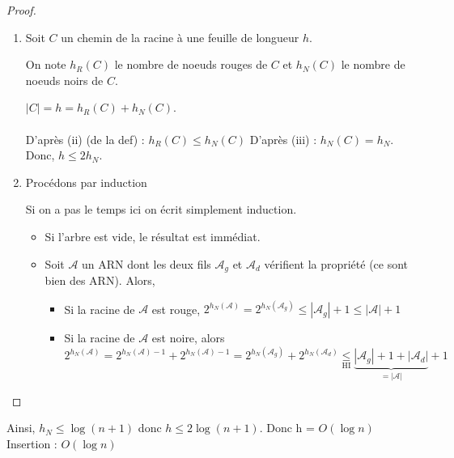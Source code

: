 \begin{proof}
	\begin{enumerate}
		\item Soit $C$ un chemin de la racine à une feuille de longueur $h$.
		
		On note $h_R(C)$ le nombre de noeuds rouges de $C$ et $h_N(C)$ le nombre de noeuds noirs de $C$.
		
		$|C| = h = h_R(C) + h_N(C)$.\\ \\
		D'après (ii) (de la def) : $h_R(C) \leq h_N(C)$
		D'après (iii) : $h_N(C) = h_N$.\\
		
		Donc, $h \leq 2 h_N$.
		
		\item Procédons par induction
		\begin{com}
			Si on a pas le temps ici on écrit simplement induction.
		\end{com}
		\begin{itemize}[label = $\star$]
			\item Si l'arbre est vide, le résultat est immédiat.
			\item Soit $\mathcal A$ un ARN dont les deux fils $\mathcal A_g$ et $\mathcal A_d$ vérifient la propriété (ce sont bien des ARN).
			Alors, \begin{itemize}
				\item Si la racine de $\mathcal A$ est rouge, $2^{h_N(\mathcal A)} = 2^{h_N(\mathcal A_g)} \leq \left| \mathcal A_g \right| +1 \leq \left| \mathcal A \right| + 1$
				\item Si la racine de $\mathcal A$ est noire, alors $2^{h_N(\mathcal A)} = 2^{h_N(\mathcal A)-1} + 2^{h_N(\mathcal A)-1} = 2^{h_N(\mathcal A_g)} + 2^{h_N(\mathcal A_d)} \underset{\text{HI}}{\leq} \underset{= \left| \mathcal A \right|}{\underbrace{\left| \mathcal A_g \right| + 1 + \left|\mathcal A_d\right|}} + 1 $
			\end{itemize}
		\end{itemize}
	\end{enumerate}
\end{proof}

Ainsi, $h_N \leq \log (n+1)$ donc $h \leq 2 \log(n+1)$. Donc h = $O(\log n)$\\

Insertion : $O(\log n)$

